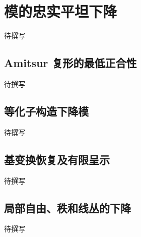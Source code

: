 
% 
% 

\section{模的忠实平坦下降}
\label{g5:sec:1602}

待撰写

\subsection{Amitsur 复形的最低正合性}
\label{g5:subsec:1602:01}
待撰写

\subsection{等化子构造下降模}
\label{g5:subsec:1602:02}
待撰写

\subsection{基变换恢复及有限呈示}
\label{g5:subsec:1602:03}
待撰写

\subsection{局部自由、秩和线丛的下降}
\label{g5:subsec:1602:04}
待撰写
